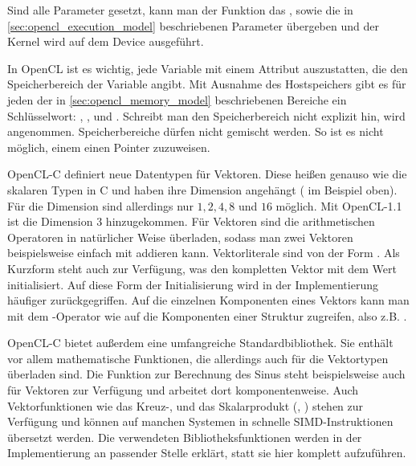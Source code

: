 Sind alle Parameter gesetzt, kann man der Funktion
 das , sowie die
in \cref{sec:opencl_execution_model} beschriebenen Parameter
übergeben und der Kernel wird auf dem Device ausgeführt.

In OpenCL ist es wichtig, jede Variable mit einem Attribut
auszustatten, die den Speicherbereich der Variable angibt. Mit
Ausnahme des Hostspeichers gibt es für jeden der in
\cref{sec:opencl_memory_model} beschriebenen Bereiche ein
Schlüsselwort: ,
,  und
. Schreibt man den Speicherbereich nicht
explizit hin, wird 
angenommen. Speicherbereiche dürfen nicht gemischt werden. So ist es
nicht möglich, einem  einen Pointer
 zuzuweisen.

OpenCL-C definiert neue Datentypen für Vektoren. Diese heißen genauso
wie die skalaren Typen in C und haben ihre Dimension angehängt
(\PimiddyzB{}  im Beispiel oben). Für die
Dimension sind allerdings nur $1,2,4,8$ und $16$ möglich. Mit
OpenCL-1.1 ist die Dimension $3$ hinzugekommen. Für Vektoren sind die
arithmetischen Operatoren in natürlicher Weise überladen, sodass man
zwei Vektoren beispielsweise einfach mit 
addieren kann. Vektorliterale sind von der Form
. Als Kurzform steht auch
 zur Verfügung, was den kompletten Vektor
mit dem Wert  initialisiert. Auf diese Form der
Initialisierung wird in der Implementierung häufiger
zurückgegriffen. Auf die einzelnen Komponenten eines Vektors kann man
mit dem -Operator wie auf die Komponenten einer
Struktur zugreifen, also z.B. .

OpenCL-C bietet außerdem eine umfangreiche Standardbibliothek. Sie
enthält vor allem mathematische Funktionen, die allerdings auch für
die Vektortypen überladen sind. Die Funktion 
zur Berechnung des Sinus steht beispielsweise auch für Vektoren zur
Verfügung und arbeitet dort komponentenweise. Auch
 Vektorfunktionen wie das Kreuz-, und das
Skalarprodukt (, )
stehen zur Verfügung und können auf manchen Systemen in schnelle
SIMD-Instruktionen übersetzt werden. Die verwendeten
Bibliotheksfunktionen werden in der Implementierung an passender
Stelle erklärt, statt sie hier komplett aufzuführen.

